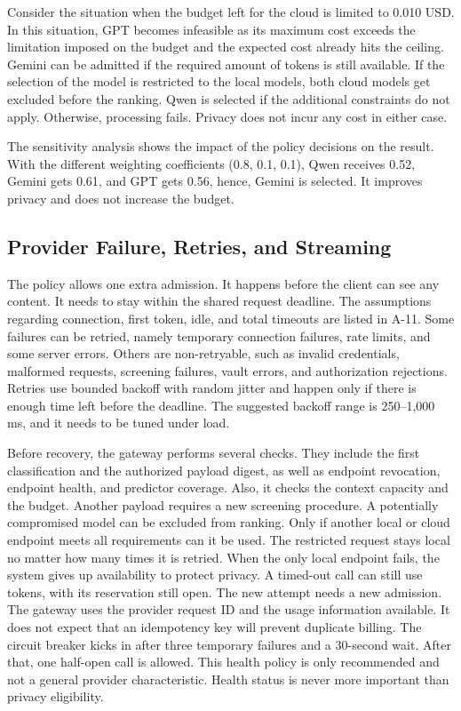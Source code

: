\documentclass{FastFyp}
\begin{document}
Consider the situation when the budget left for the cloud is limited to 0.010 USD. In this situation, GPT becomes infeasible as its maximum cost exceeds the limitation imposed on the budget and the expected cost already hits the ceiling. Gemini can be admitted if the required amount of tokens is still available. If the selection of the model is restricted to the local models, both cloud models get excluded before the ranking. Qwen is selected if the additional constraints do not apply. Otherwise, processing fails. Privacy does not incur any cost in either case.

The sensitivity analysis shows the impact of the policy decisions on the result. With the different weighting coefficients (0.8, 0.1, 0.1), Qwen receives 0.52, Gemini gets 0.61, and GPT gets 0.56, hence, Gemini is selected. It improves privacy and does not increase the budget.

\subsection{Provider Failure, Retries, and Streaming}
The policy allows one extra admission. It happens before the client can see any content. It needs to stay within the shared request deadline. The assumptions regarding connection, first token, idle, and total timeouts are listed in A-11. Some failures can be retried, namely temporary connection failures, rate limits, and some server errors. Others are non-retryable, such as invalid credentials, malformed requests, screening failures, vault errors, and authorization rejections. Retries use bounded backoff with random jitter and happen only if there is enough time left before the deadline. The suggested backoff range is 250–1,000 ms, and it needs to be tuned under load.

Before recovery, the gateway performs several checks. They include the first classification and the authorized payload digest, as well as endpoint revocation, endpoint health, and predictor coverage. Also, it checks the context capacity and the budget. Another payload requires a new screening procedure. A potentially compromised model can be excluded from ranking. Only if another local or cloud endpoint meets all requirements can it be used. The restricted request stays local no matter how many times it is retried. When the only local endpoint fails, the system gives up availability to protect privacy.
A timed-out call can still use tokens, with its reservation still open. The new attempt needs a new admission. The gateway uses the provider request ID and the usage information available. It does not expect that an idempotency key will prevent duplicate billing. The circuit breaker kicks in after three temporary failures and a 30-second wait. After that, one half-open call is allowed. This health policy is only recommended and not a general provider characteristic. Health status is never more important than privacy eligibility.
\end{document}
